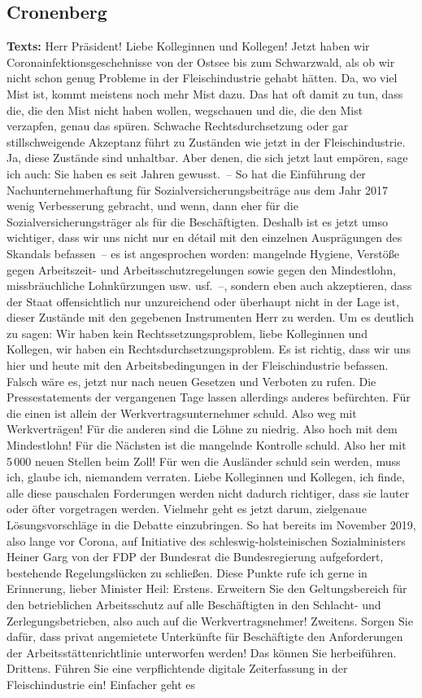 \documentclass{article}
\begin{document}
\subsection{Cronenberg}
\noindent\textbf{Texts:} Herr Präsident! Liebe Kolleginnen und Kollegen! Jetzt haben wir Coronainfektionsgeschehnisse von der Ostsee bis zum Schwarzwald, als ob wir nicht schon genug Probleme in der Fleischindustrie gehabt hätten. Da, wo viel Mist ist, kommt meistens noch mehr Mist dazu. Das hat oft damit zu tun, dass die, die den Mist nicht haben wollen, wegschauen und die, die den Mist verzapfen, genau das spüren. Schwache Rechtsdurchsetzung oder gar stillschweigende Akzeptanz führt zu Zuständen wie jetzt in der Fleischindustrie. Ja, diese Zustände sind unhaltbar.  Aber denen, die sich jetzt laut empören, sage ich auch: Sie haben es seit Jahren gewusst. – So hat die Einführung der Nachunternehmerhaftung für Sozialversicherungsbeiträge aus dem Jahr 2017 wenig Verbesserung gebracht, und wenn, dann eher für die Sozialversicherungsträger als für die Beschäftigten.  Deshalb ist es jetzt umso wichtiger, dass wir uns nicht nur en détail mit den einzelnen Ausprägungen des Skandals befassen – es ist angesprochen worden: mangelnde Hygiene, Verstöße gegen Arbeitszeit- und Arbeitsschutzregelungen sowie  gegen den Mindestlohn, missbräuchliche Lohnkürzungen usw. usf. –, sondern eben auch akzeptieren, dass der Staat offensichtlich nur unzureichend oder überhaupt nicht in der Lage ist, dieser Zustände mit den gegebenen Instrumenten Herr zu werden.  Um es deutlich zu sagen: Wir haben kein Rechtssetzungsproblem, liebe Kolleginnen und Kollegen, wir haben ein Rechtsdurchsetzungsproblem.  Es ist richtig, dass wir uns hier und heute mit den Arbeitsbedingungen in der Fleischindustrie befassen. Falsch wäre es, jetzt nur nach neuen Gesetzen und Verboten zu rufen. Die Pressestatements der vergangenen Tage lassen allerdings anderes befürchten. Für die einen ist allein der Werkvertragsunternehmer schuld. Also weg mit Werkverträgen! Für die anderen sind die Löhne zu niedrig. Also hoch mit dem Mindestlohn!  Für die Nächsten ist die mangelnde Kontrolle schuld. Also her mit 5 000 neuen Stellen beim Zoll! Für wen die Ausländer schuld sein werden, muss ich, glaube ich, niemandem verraten. Liebe Kolleginnen und Kollegen, ich finde, alle diese pauschalen Forderungen werden nicht dadurch richtiger, dass sie lauter oder öfter vorgetragen werden. Vielmehr geht es jetzt darum, zielgenaue Lösungsvorschläge in die Debatte einzubringen. So hat bereits im November 2019, also lange vor Corona, auf Initiative des schleswig-holsteinischen Sozialministers Heiner Garg von der FDP der Bundesrat die Bundesregierung aufgefordert, bestehende Regelungslücken zu schließen. Diese Punkte rufe ich gerne in Erinnerung, lieber Minister Heil: Erstens. Erweitern Sie den Geltungsbereich für den betrieblichen Arbeitsschutz auf alle Beschäftigten in den Schlacht- und Zerlegungsbetrieben, also auch auf die Werkvertragsnehmer!  Zweitens. Sorgen Sie dafür, dass privat angemietete Unterkünfte für Beschäftigte den Anforderungen der Arbeitsstättenrichtlinie unterworfen werden! Das können Sie herbeiführen.  Drittens. Führen Sie eine verpflichtende digitale Zeiterfassung in der Fleischindustrie ein! Einfacher geht es 
\end{document}
